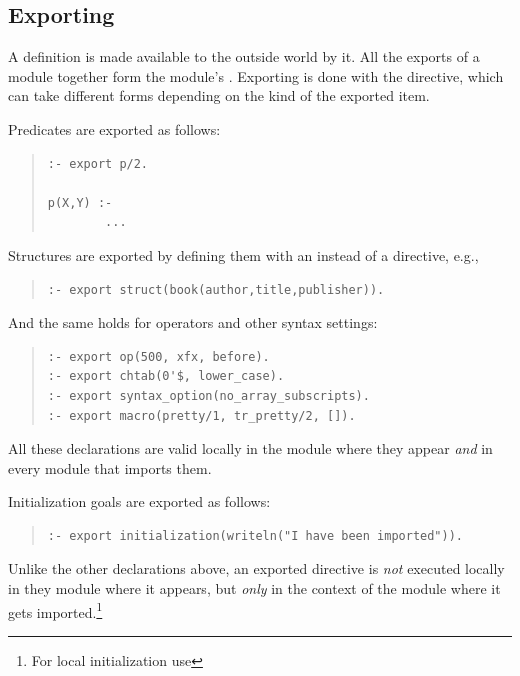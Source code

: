 \subsection{Exporting}

A definition is made available to the outside world by  it.
All the exports of a module together form the module's .
Exporting is done with the
directive, which can take
different forms depending on the kind of the exported item.

Predicates are exported as follows:
\begin{quote}
\begin{verbatim}
:- export p/2.

p(X,Y) :-
        ...
\end{verbatim}
\end{quote}

Structures are exported by defining them with an
instead of a
directive, e.g.,
\begin{quote}
\begin{verbatim}
:- export struct(book(author,title,publisher)).
\end{verbatim}
\end{quote}

And the same holds for operators and other syntax settings:
\begin{quote}
\begin{verbatim}
:- export op(500, xfx, before).
:- export chtab(0'$, lower_case).
:- export syntax_option(no_array_subscripts).
:- export macro(pretty/1, tr_pretty/2, []).
\end{verbatim}
\end{quote}
All these declarations are valid locally in the module where they appear
\emph{and} in every module that imports them.

Initialization goals are exported as follows:
\begin{quote}
\begin{verbatim}
:- export initialization(writeln("I have been imported")).
\end{verbatim}
\end{quote}
Unlike the other declarations above, an exported
 directive is
\emph{not} executed locally in
they module where it appears, but \emph{only} in the context of the
module where it gets imported.\footnote{%
  For local initialization use
  }


